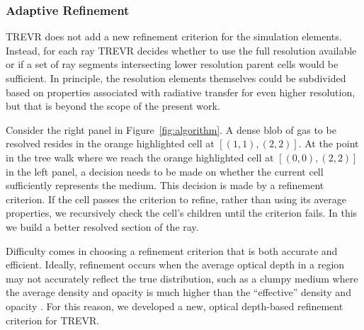 \documentclass[fleq,usenatbib]{mnras}
\newcommand{\acro}{TREVR}
\begin{document}
{\subsubsection{Adaptive Refinement}\label{sec:adref}

\acro{} does not add a new refinement criterion for the simulation elements.
Instead, for each ray \acro{} decides whether to use the full resolution available or
if a set of ray segments intersecting lower resolution parent cells would be sufficient.
In principle, the resolution elements themselves could be subdivided based
on properties associated with radiative transfer for even higher resolution,
but that is beyond the scope of the present work.

Consider the right panel in Figure~\ref{fig:algorithm}. A dense blob of gas 
to be resolved resides in the orange highlighted cell at $[(1,1),(2,2)]$. At 
the point in the tree walk where we reach the orange highlighted cell at 
$[(0,0),(2,2)]$ in the left panel, a decision needs to be made on whether the 
current cell sufficiently represents the medium. This decision is made by a 
refinement criterion. If the cell passes the criterion to refine, rather than 
using its average properties, we recursively check the cell's children until 
the criterion fails. In this we build a better resolved section of the ray. 

Difficulty comes in choosing a refinement criterion that is both accurate and 
efficient. Ideally, refinement occurs when the average optical depth 
in a region may not accurately reflect the true distribution, such as a clumpy 
medium where the average density and opacity is much higher than the 
``effective'' density and opacity \citep{varosiDwek99, hegmanKegel03}. For 
this reason, we developed a new, optical depth-based refinement criterion 
for \acro{}.

}
\end{document}
